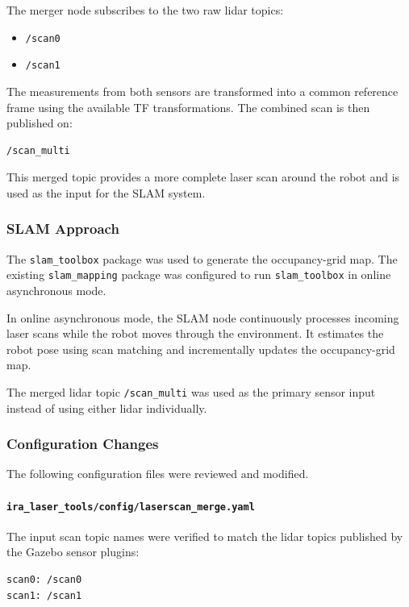 \documentclass{article}
\begin{document}
The merger node subscribes to the two raw lidar topics:

\begin{itemize}
    \item \texttt{/scan0}
    \item \texttt{/scan1}
\end{itemize}

The measurements from both sensors are transformed into a common reference frame using the available TF transformations. The combined scan is then published on:

\begin{verbatim}
/scan_multi
\end{verbatim}

This merged topic provides a more complete laser scan around the robot and is used as the input for the SLAM system.

\subsubsection{SLAM Approach}

The \texttt{slam\_toolbox} package was used to generate the occupancy-grid map. The existing \texttt{slam\_mapping} package was configured to run \texttt{slam\_toolbox} in online asynchronous mode.

In online asynchronous mode, the SLAM node continuously processes incoming laser scans while the robot moves through the environment. It estimates the robot pose using scan matching and incrementally updates the occupancy-grid map.

The merged lidar topic \texttt{/scan\_multi} was used as the primary sensor input instead of using either lidar individually.

\subsubsection{Configuration Changes}

The following configuration files were reviewed and modified.

\paragraph{\texttt{ira\_laser\_tools/config/laserscan\_merge.yaml}}

The input scan topic names were verified to match the lidar topics published by the Gazebo sensor plugins:

\begin{verbatim}
scan0: /scan0
scan1: /scan1
\end{verbatim}
\end{document}
